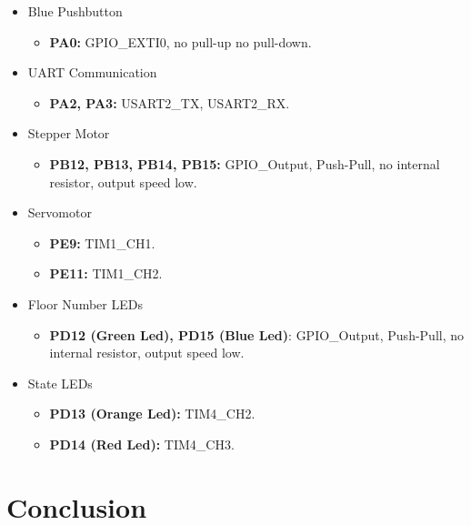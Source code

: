 \begin{itemize}
    \item Blue Pushbutton 
        \begin{itemize}
            \item \textbf{PA0:} GPIO\_EXTI0, no pull-up no pull-down. 
        \end{itemize}
    
    \item UART Communication
        \begin{itemize}
            \item \textbf{PA2, PA3:} USART2\_TX, USART2\_RX.
        \end{itemize}
    
    \item Stepper Motor
        \begin{itemize}
            \item \textbf{PB12, PB13, PB14, PB15:} GPIO\_Output, Push-Pull, no internal resistor, output speed low.
        \end{itemize}
    
    \item Servomotor
        \begin{itemize}
            \item \textbf{PE9:} TIM1\_CH1.
            \item \textbf{PE11:} TIM1\_CH2.
        \end{itemize}
        
    \item Floor Number LEDs
        \begin{itemize}
            \item \textbf{PD12 (Green Led), PD15 (Blue Led)}: GPIO\_Output, Push-Pull, no internal resistor, output speed low.
        \end{itemize}
        
    \item State LEDs
        \begin{itemize}
            \item \textbf{PD13 (Orange Led):} TIM4\_CH2.
            \item \textbf{PD14 (Red Led):} TIM4\_CH3.
        \end{itemize}
        
\end{itemize}

\section{Conclusion}


